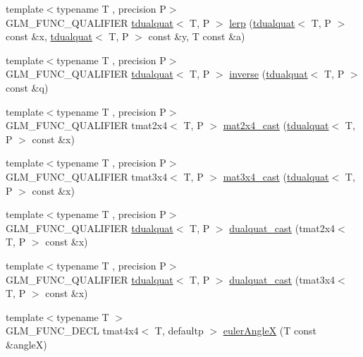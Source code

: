 \begin{DoxyCompactItemize}
\item 
{\footnotesize template$<$typename T , precision P$>$ }\\G\+L\+M\+\_\+\+F\+U\+N\+C\+\_\+\+Q\+U\+A\+L\+I\+F\+I\+E\+R \hyperlink{structglm_1_1tdualquat}{tdualquat}$<$ T, P $>$ \hyperlink{group__gtx__dual__quaternion_ga8039b88397ca09275be924a26a806a59}{lerp} (\hyperlink{structglm_1_1tdualquat}{tdualquat}$<$ T, P $>$ const \&x, \hyperlink{structglm_1_1tdualquat}{tdualquat}$<$ T, P $>$ const \&y, T const \&a)
\item 
{\footnotesize template$<$typename T , precision P$>$ }\\G\+L\+M\+\_\+\+F\+U\+N\+C\+\_\+\+Q\+U\+A\+L\+I\+F\+I\+E\+R \hyperlink{structglm_1_1tdualquat}{tdualquat}$<$ T, P $>$ \hyperlink{group__gtx__dual__quaternion_ga2149d3cb8af04d9530de0cd16aa1aab2}{inverse} (\hyperlink{structglm_1_1tdualquat}{tdualquat}$<$ T, P $>$ const \&q)
\item 
{\footnotesize template$<$typename T , precision P$>$ }\\G\+L\+M\+\_\+\+F\+U\+N\+C\+\_\+\+Q\+U\+A\+L\+I\+F\+I\+E\+R tmat2x4$<$ T, P $>$ \hyperlink{group__gtx__dual__quaternion_ga2d124748183e12db8288eeaca350298e}{mat2x4\+\_\+cast} (\hyperlink{structglm_1_1tdualquat}{tdualquat}$<$ T, P $>$ const \&x)
\item 
{\footnotesize template$<$typename T , precision P$>$ }\\G\+L\+M\+\_\+\+F\+U\+N\+C\+\_\+\+Q\+U\+A\+L\+I\+F\+I\+E\+R tmat3x4$<$ T, P $>$ \hyperlink{group__gtx__dual__quaternion_ga576745d979e3c079a64152490c816954}{mat3x4\+\_\+cast} (\hyperlink{structglm_1_1tdualquat}{tdualquat}$<$ T, P $>$ const \&x)
\item 
{\footnotesize template$<$typename T , precision P$>$ }\\G\+L\+M\+\_\+\+F\+U\+N\+C\+\_\+\+Q\+U\+A\+L\+I\+F\+I\+E\+R \hyperlink{structglm_1_1tdualquat}{tdualquat}$<$ T, P $>$ \hyperlink{group__gtx__dual__quaternion_gada9799afe2b62394dc498534beb5bc78}{dualquat\+\_\+cast} (tmat2x4$<$ T, P $>$ const \&x)
\item 
{\footnotesize template$<$typename T , precision P$>$ }\\G\+L\+M\+\_\+\+F\+U\+N\+C\+\_\+\+Q\+U\+A\+L\+I\+F\+I\+E\+R \hyperlink{structglm_1_1tdualquat}{tdualquat}$<$ T, P $>$ \hyperlink{group__gtx__dual__quaternion_ga20eb5758beb73cc6dbc2d9104f03ec20}{dualquat\+\_\+cast} (tmat3x4$<$ T, P $>$ const \&x)
\item 
{\footnotesize template$<$typename T $>$ }\\G\+L\+M\+\_\+\+F\+U\+N\+C\+\_\+\+D\+E\+C\+L tmat4x4$<$ T, defaultp $>$ \hyperlink{group__gtx__euler__angles_ga82cd3b8a04943f1a0d1a562aff358dc8}{euler\+Angle\+X} (T const \&angle\+X)

\end{DoxyCompactItemize}
